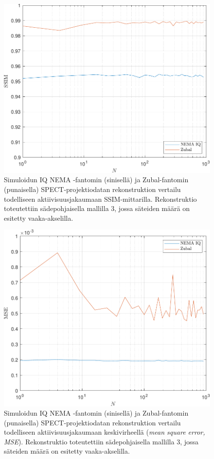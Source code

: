 \begin{figure}[H]
    \centering
    \captionsetup{width=.9\linewidth}
    \includegraphics[width=.9\linewidth]{kuvat/vertailu_SSIM.pdf}
    \caption{Simuloidun IQ NEMA -fantomin (sinisellä) ja Zubal-fantomin (punaisella) SPECT-projektiodatan rekonstruktion vertailu todelliseen aktiivisuusjakaumaan SSIM-mittarilla. Rekonstruktio toteutettiin sädepohjaisella mallilla 3, jossa säteiden määrä on esitetty vaaka-akselilla.}
    \label{fig:vertailu_SSIM}
\end{figure}
\begin{figure}[H]
    \centering
    \captionsetup{width=.9\linewidth}
    \includegraphics[width=.9\linewidth]{kuvat/vertailu_MSE.pdf}
    \caption{Simuloidun IQ NEMA -fantomin (sinisellä) ja Zubal-fantomin (punaisella) SPECT-projektiodatan rekonstruktion vertailu todelliseen aktiivisuusjakaumaan keskivirheellä (\textit{mean square error, MSE}). Rekonstruktio toteutettiin sädepohjaisella mallilla 3, jossa säteiden määrä on esitetty vaaka-akselilla.}
    \label{fig:vertailu_MSE}
\end{figure}

